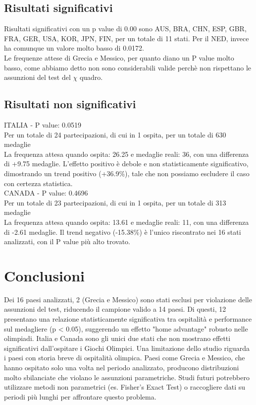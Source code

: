 \subsection{Risultati significativi}
Risultati significativi con un p value di 0.00 sono AUS, BRA, CHN, ESP, GBR, FRA, 
GER, USA, KOR, JPN, FIN, per un totale di 11 stati. Per il NED, invece ha comunque
un valore molto basso di 0.0172.\\
Le frequenze attese di Grecia e Messico, per quanto diano un P value molto basso, 
come abbiamo detto non sono considerabili valide perchè non rispettano le assunzioni 
del test del $\chi$ quadro.

\subsection{Risultati non significativi}

ITALIA - P value: 0.0519\\
Per un totale di 24 partecipazioni, di cui in 1 ospita, per un totale di 630 medaglie \\
La frequenza attesa quando ospita: 26.25 e medaglie reali: 36, con una differenza 
di +9.75 medaglie. 
L'effetto positivo è debole e non statisticamente significativo, dimostrando un 
trend positivo (+36.9\%), tale che non possiamo escludere il caso con certezza statistica.\\
CANADA - P value: 0.4696\\
Per un totale di 23 partecipazioni, di cui in 1 ospita, per un totale di 313 medaglie\\
La frequenza attesa quando ospita: 13.61 e medaglie reali: 11, con una differenza 
di -2.61 medaglie.
Il trend negativo (-15.38\%) è l'unico riscontrato nei 16 stati analizzati, 
con il P value più alto trovato. 


\section{Conclusioni}
Dei 16 paesi analizzati, 2 (Grecia e Messico) sono stati esclusi per violazione delle
assunzioni del test, riducendo il campione valido a 14 paesi. Di questi, 12 
presentano una relazione statisticamente significativa tra ospitalità e performance sul 
medagliere (p < 0.05), suggerendo un effetto "home advantage" robusto nelle olimpiadi.
Italia e Canada sono gli unici due stati che non mostrano effetti significativi 
dall'ospitare i Giochi Olimpici.
Una limitazione dello studio riguarda i paesi con storia breve di ospitalità 
olimpica. Paesi come Grecia e Messico, che hanno ospitato solo una volta nel 
periodo analizzato, producono distribuzioni molto sbilanciate che violano le assunzioni 
parametriche. Studi futuri potrebbero utilizzare metodi non parametrici 
(es. Fisher's Exact Test) o raccogliere dati su periodi più lunghi per affrontare 
questo problema.